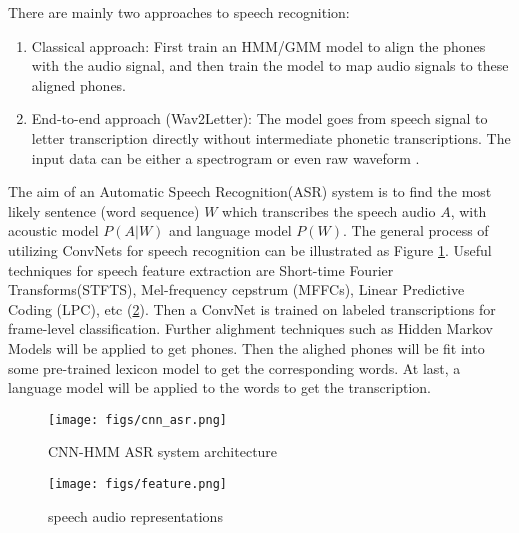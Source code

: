 There are mainly two approaches to speech recognition:
\begin{enumerate}
    \item Classical approach: First train an HMM/GMM model to align the phones with the audio signal, and then train the model to map audio signals to these aligned phones.
    \item End-to-end approach (Wav2Letter): The model goes from speech signal to letter transcription directly without intermediate phonetic transcriptions. The input data can be either a spectrogram or even raw waveform \cite{Collobert2017Wav2LetterAE}.
\end{enumerate}
The aim of an Automatic Speech Recognition(ASR) system is to find the most likely sentence (word sequence) $W$ which transcribes the speech audio $A$, with acoustic model $P(A|W)$ and language model $P(W)$. The general process of utilizing ConvNets for speech recognition can be illustrated as Figure \ref{fig:cnn_asr}.
Useful techniques for speech feature extraction are Short-time Fourier Transforms(STFTS), Mel-frequency cepstrum (MFFCs), Linear Predictive Coding (LPC), etc (\ref{fig:feature}). Then a ConvNet is trained on labeled transcriptions for frame-level classification. Further alighment techniques such as Hidden Markov Models will be applied to get phones. Then the alighed phones will be fit into some pre-trained lexicon model to get the corresponding words. At last, a language model will be applied to the words to get the transcription. 
\begin{figure}[ht]
    \centering
    \texttt{[image: figs/cnn\_asr.png]}
    \caption{CNN-HMM ASR system architecture}
    \label{fig:cnn_asr}
\end{figure}
\begin{figure}[ht]
    \centering
    \texttt{[image: figs/feature.png]}
    \caption{speech audio representations}
    \label{fig:feature}
\end{figure}